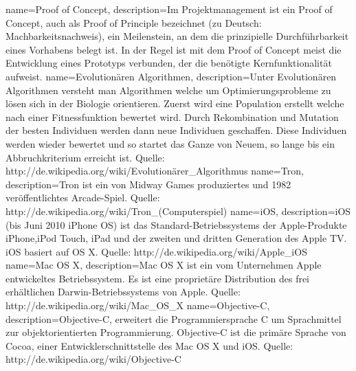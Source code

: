 	{
		name={Proof of Concept},
		description={Im Projektmanagement ist ein Proof of Concept, auch als Proof of Principle bezeichnet (zu Deutsch: Machbarkeitsnachweis), ein Meilenstein, an dem die prinzipielle Durchführbarkeit eines Vorhabens belegt ist. In der Regel ist mit dem Proof of Concept meist die Entwicklung eines Prototyps verbunden, der die benötigte Kernfunktionalität aufweist.}
	}
	{
		name={Evolutionären Algorithmen},
		description={Unter Evolutionären Algorithmen versteht man Algorithmen welche um Optimierungsprobleme zu lösen sich in der Biologie orientieren. Zuerst wird eine Population erstellt welche nach einer Fitnessfunktion bewertet wird. Durch Rekombination und Mutation der besten Individuen werden dann neue Individuen geschaffen. Diese Individuen werden wieder bewertet und so startet das Ganze von Neuem, so lange bis ein Abbruchkriterium erreicht ist. \newline Quelle: http://de.wikipedia.org/wiki/Evolutionärer\_Algorithmus}
	}
	{
		name={Tron},
		description={Tron ist ein von Midway Games produziertes und 1982 veröffentlichtes Arcade-Spiel. \newline Quelle: http://de.wikipedia.org/wiki/Tron\_(Computerspiel)}
	}
	{
		name={iOS},
		description={iOS (bis Juni 2010 iPhone OS) ist das Standard-Betriebssystems der Apple-Produkte iPhone,iPod Touch, iPad und der zweiten und dritten Generation des Apple TV. iOS basiert auf OS X. \newline Quelle: http://de.wikipedia.org/wiki/Apple\_iOS}
	}
	{
		name={Mac OS X},
		description={Mac OS X ist ein vom Unternehmen Apple entwickeltes Betriebssystem. Es ist eine proprietäre Distribution des frei erhältlichen Darwin-Betriebssystems von Apple. \newline Quelle: http://de.wikipedia.org/wiki/Mac\_OS\_X}
	}
	{
		name={Objective-C},
		description={Objective-C, erweitert die Programmiersprache C um Sprachmittel zur objektorientierten Programmierung. Objective-C ist die primäre Sprache von Cocoa, einer Entwicklerschnittstelle des Mac OS X und iOS. \newline Quelle: http://de.wikipedia.org/wiki/Objective-C}
	}
